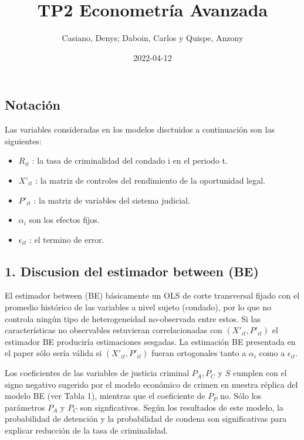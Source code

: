 \documentclass[
]{article}
\title{TP2 Econometría Avanzada}
\author{Casiano, Denys; Daboin, Carlos y Quispe, Anzony}
\date{2022-04-12}
\providecommand{\tightlist}{%
  \setlength{\itemsep}{0pt}\setlength{\parskip}{0pt}}
\begin{document}
\maketitle

\hypertarget{notaciuxf3n}{%
\subsection{Notación}\label{notaciuxf3n}}

Las variables consideradas en los modelos disctuidos a continuación son
las siguientes:

\begin{itemize}
\tightlist
\item
  \(R_{it}\) : la tasa de criminalidad del condado i en el periodo t.
\item
  \(X'_{it}\) : la matriz de controles del rendimiento de la oportunidad
  legal.
\item
  \(P'_{it}\) : la matriz de variables del sistema judicial.
\item
  \(\alpha_{i}\) son los efectos fijos.
\item
  \(\epsilon_{it}\) : el termino de error.
\end{itemize}

\hypertarget{discusion-del-estimador-between-be}{%
\subsection{1. Discusion del estimador between
(BE)}\label{discusion-del-estimador-between-be}}

El estimador between (BE) básicamente un OLS de corte transversal fijado
con el promedio histórico de las variables a nivel sujeto (condado), por
lo que no controla ningún tipo de heterogeneidad no-observada entre
estos. Si las características no observables estuvieran correlacionadas
con \((X'_{it},P'_{it})\) el estimador BE produciría estimaciones
sesgadas. La estimación BE presentada en el paper sólo sería válida si
\((X'_{it},P'_{it})\) fueran ortogonales tanto a \(\alpha_i\) como a
\(\epsilon_{it}\).

Los coeficientes de las variables de justicia criminal \(P_A, P_C\) y
\(S\) cumplen con el signo negativo sugerido por el modelo económico de
crimen en nuestra réplica del modelo BE (ver Tabla 1), mientras que el
coeficiente de \(P_P\) no. Sólo los parámetros \(P_A\) y \(P_C\) son
signficativos. Según los resultados de este modelo, la probabilidad de
detención y la probabilidad de condena son significativas para explicar
reducción de la tasa de criminalidad.
\end{document}
